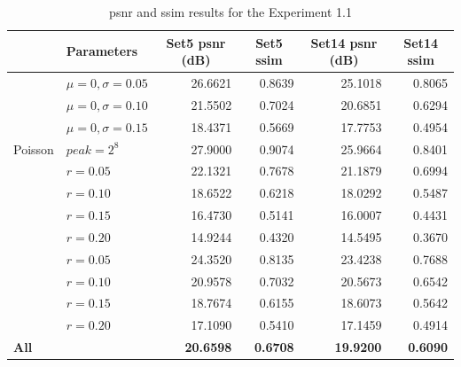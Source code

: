 \begin{table}[h]
	\centering
	\begin{tabular}{|l|l|r|r|r|r|}
		\hline
		\rowcolor[HTML]{EFEFEF} 
		\multicolumn{1}{|c|}{\cellcolor[HTML]{EFEFEF}\textbf{Noise}} & \textbf{Parameters} & \multicolumn{1}{c|}{\cellcolor[HTML]{EFEFEF}\textbf{Set5 \gls{psnr} (dB)}} & \multicolumn{1}{c|}{\cellcolor[HTML]{EFEFEF}\textbf{Set5 \gls{ssim}}} & \multicolumn{1}{c|}{\cellcolor[HTML]{EFEFEF}\textbf{Set14 \gls{psnr} (dB)}} & \multicolumn{1}{c|}{\cellcolor[HTML]{EFEFEF}\textbf{Set14 \gls{ssim}}} \\ \hline
		\rowcolor[HTML]{FFFFFF} 
		\cellcolor[HTML]{EFEFEF} & $\mu=0, \sigma=0.05$ & 26.6621 & 0.8639 & 25.1018 & 0.8065 \\
		\rowcolor[HTML]{EFEFEF} 
		\cellcolor[HTML]{EFEFEF} & $\mu=0, \sigma=0.10$ & 21.5502 & 0.7024 & 20.6851 & 0.6294 \\
		\rowcolor[HTML]{FFFFFF} 
		\multirow{-3}{*}{\cellcolor[HTML]{EFEFEF}Gaussian} & $\mu=0, \sigma=0.15$ & 18.4371 & 0.5669 & 17.7753 & 0.4954 \\
		\rowcolor[HTML]{EFEFEF} 
		Poisson & $peak=2^8$ & 27.9000 & 0.9074 & 25.9664 & 0.8401 \\
		\rowcolor[HTML]{FFFFFF} 
		\cellcolor[HTML]{EFEFEF} & $r=0.05$ & 22.1321 & 0.7678 & 21.1879 & 0.6994 \\
		\rowcolor[HTML]{EFEFEF} 
		\cellcolor[HTML]{EFEFEF} & $r=0.10$ & 18.6522 & 0.6218 & 18.0292 & 0.5487 \\
		\rowcolor[HTML]{FFFFFF} 
		\cellcolor[HTML]{EFEFEF} & $r=0.15$ & 16.4730 & 0.5141 & 16.0007 & 0.4431 \\
		\rowcolor[HTML]{EFEFEF} 
		\multirow{-4}{*}{\cellcolor[HTML]{EFEFEF}Salt-and-pepper} & $r=0.20$ & 14.9244 & 0.4320 & 14.5495 & 0.3670 \\
		\rowcolor[HTML]{FFFFFF} 
		\cellcolor[HTML]{EFEFEF} & $r=0.05$ & 24.3520 & 0.8135 & 23.4238 & 0.7688 \\
		\rowcolor[HTML]{EFEFEF} 
		\cellcolor[HTML]{EFEFEF} & $r=0.10$ & 20.9578 & 0.7032 & 20.5673 & 0.6542 \\
		\rowcolor[HTML]{FFFFFF} 
		\cellcolor[HTML]{EFEFEF} & $r=0.15$ & 18.7674 & 0.6155 & 18.6073 & 0.5642 \\
		\rowcolor[HTML]{EFEFEF} 
		\multirow{-4}{*}{\cellcolor[HTML]{EFEFEF}Uniform} & $r=0.20$ & 17.1090 & 0.5410 & 17.1459 & 0.4914 \\
		\rowcolor[HTML]{FFFFFF} 
		\textbf{All} &  & \textbf{20.6598} & \textbf{0.6708} & \textbf{19.9200} & \textbf{0.6090}\\\hline
	\end{tabular}
	\caption{\gls{psnr} and \gls{ssim} results for the Experiment 1.1}
	\label{tab:experiment11}
\end{table}

